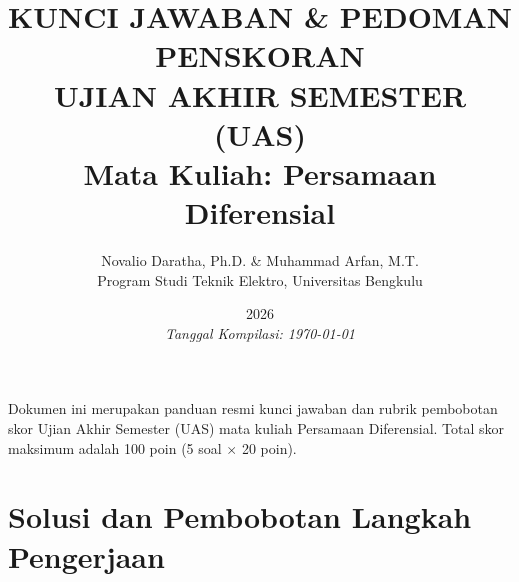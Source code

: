 \documentclass[11pt,a4paper]{article}
\title{\vspace{-2cm}\textbf{KUNCI JAWABAN \& PEDOMAN PENSKORAN\\UJIAN AKHIR SEMESTER (UAS)\\Mata Kuliah: Persamaan Diferensial}}
\author{Novalio Daratha, Ph.D. \& Muhammad Arfan, M.T.\\Program Studi Teknik Elektro, Universitas Bengkulu}
\date{2026 \\ \vspace{2mm}\small\textit{Tanggal Kompilasi: \today}}
\begin{document}
\maketitle

\begin{tcolorbox}[colback=red!5!white,colframe=red!75!black,title=Informasi Dosen \& Asisten]
Dokumen ini merupakan panduan resmi kunci jawaban dan rubrik pembobotan skor Ujian Akhir Semester (UAS) mata kuliah Persamaan Diferensial. Total skor maksimum adalah 100 poin (5 soal $\times$ 20 poin).
\end{tcolorbox}

\section*{Solusi dan Pembobotan Langkah Pengerjaan}
\end{document}
